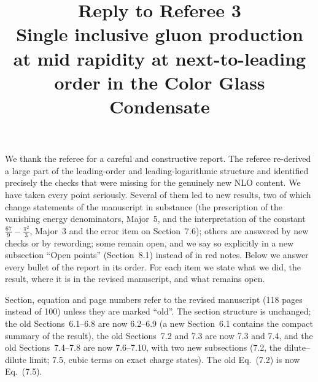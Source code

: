 \documentclass[a4paper,11pt]{article}
\title{Reply to Referee 3\\[4pt]\large Single inclusive gluon production at mid rapidity at next-to-leading order in the Color Glass Condensate}
\date{}
\begin{document}
\sloppy
\maketitle
\vspace{-1.5cm}

We thank the referee for a careful and constructive report. The referee re-derived a large part of the leading-order and leading-logarithmic structure and identified precisely the checks that were missing for the genuinely new NLO content. We have taken every point seriously. Several of them led to new results, two of which change statements of the manuscript in substance (the prescription of the vanishing energy denominators, Major~5, and the interpretation of the constant $\frac{67}{9}-\frac{\pi^2}{3}$, Major~3 and the error item on Section~7.6); others are answered by new checks or by rewording; some remain open, and we say so explicitly in a new subsection ``Open points'' (Section~8.1) instead of in red notes. Below we answer every bullet of the report in its order. For each item we state what we did, the result, where it is in the revised manuscript, and what remains open.

Section, equation and page numbers refer to the revised manuscript (118 pages instead of 100) unless they are marked ``old''. The section structure is unchanged; the old Sections~6.1--6.8 are now 6.2--6.9 (a new Section~6.1 contains the compact summary of the result), the old Sections~7.2 and 7.3 are now 7.3 and 7.4, and the old Sections~7.4--7.8 are now 7.6--7.10, with two new subsections (7.2, the dilute--dilute limit; 7.5, cubic terms on exact charge states). The old Eq.~(7.2) is now Eq.~(7.5).
\end{document}
